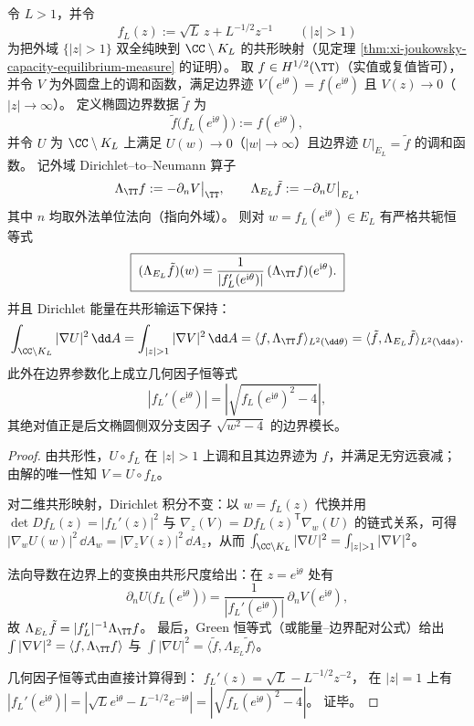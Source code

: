 \begin{theorem}\label{thm:xi-joukowsky-dtn-conjugacy}
令 \(L>1\)，并令
\[
f_L(z):=\sqrt{L}\,z+L^{-1/2}z^{-1}\qquad(|z|>1)
\]
为把外域 \(\{|z|>1\}\) 双全纯映到 \(\CC\setminus K_L\) 的共形映射（见定理 \ref{thm:xi-joukowsky-capacity-equilibrium-measure} 的证明）。
取 \(f\in H^{1/2}(\TT)\)（实值或复值皆可），并令 \(V\) 为外圆盘上的调和函数，满足边界迹 \(V(e^{\mathrm{i}\theta})=f(e^{\mathrm{i}\theta})\) 且 \(V(z)\to 0\)（\(|z|\to\infty\)）。
定义椭圆边界数据 \(\tilde f\) 为
\[
\tilde f\bigl(f_L(e^{\mathrm{i}\theta})\bigr):=f(e^{\mathrm{i}\theta}),
\]
并令 \(U\) 为 \(\CC\setminus K_L\) 上满足 \(U(w)\to 0\)（\(|w|\to\infty\)）且边界迹 \(U|_{E_L}=\tilde f\) 的调和函数。
记外域 Dirichlet--to--Neumann 算子
\[
\Lambda_{\TT}f:=-\partial_{n}V\big|_{\TT},
\qquad
\Lambda_{E_L}\tilde f:=-\partial_{n}U\big|_{E_L},
\]
其中 \(n\) 均取外法单位法向（指向外域）。
则对 \(w=f_L(e^{\mathrm{i}\theta})\in E_L\) 有严格共轭恒等式
\[
\boxed{\;
(\Lambda_{E_L}\tilde f)(w)=\frac{1}{|f_L'(e^{\mathrm{i}\theta})|}\,(\Lambda_{\TT}f)(e^{\mathrm{i}\theta}).\;}
\]
并且 Dirichlet 能量在共形输运下保持：
\[
\int_{\CC\setminus K_L}|\nabla U|^2\,\dd A
=\int_{|z|>1}|\nabla V|^2\,\dd A
=\langle f,\Lambda_{\TT}f\rangle_{L^2(\dd\theta)}
=\langle \tilde f,\Lambda_{E_L}\tilde f\rangle_{L^2(\dd s)}.
\]
此外在边界参数化上成立几何因子恒等式
\[
|f_L'(e^{\mathrm{i}\theta})|
=\left|\sqrt{f_L(e^{\mathrm{i}\theta})^{2}-4}\right|,
\]
其绝对值正是后文椭圆侧双分支因子 \(\sqrt{w^2-4}\) 的边界模长。
\end{theorem}
\begin{proof}
由共形性，\(U\circ f_L\) 在 \(|z|>1\) 上调和且其边界迹为 \(f\)，并满足无穷远衰减；由解的唯一性知 \(V=U\circ f_L\)。
\par
对二维共形映射，Dirichlet 积分不变：以 \(w=f_L(z)\) 代换并用 \(\det Df_L(z)=|f_L'(z)|^2\) 与 \(\nabla_z(V)=Df_L(z)^{\mathsf T}\nabla_w(U)\) 的链式关系，可得
\(
|\nabla_w U(w)|^2\,\dd A_w=|\nabla_z V(z)|^2\,\dd A_z
\)，从而 \(\int_{\CC\setminus K_L}|\nabla U|^2=\int_{|z|>1}|\nabla V|^2\)。
\par
法向导数在边界上的变换由共形尺度给出：在 \(z=e^{\mathrm{i}\theta}\) 处有
\[
\partial_n U\bigl(f_L(e^{\mathrm{i}\theta})\bigr)=\frac{1}{|f_L'(e^{\mathrm{i}\theta})|}\,\partial_n V(e^{\mathrm{i}\theta}),
\]
故 \(\Lambda_{E_L}\tilde f=|f_L'|^{-1}\Lambda_{\TT}f\)。
最后，Green 恒等式（或能量--边界配对公式）给出
\(
\int |\nabla V|^2=\langle f,\Lambda_{\TT}f\rangle
\) 与
\(
\int |\nabla U|^2=\langle \tilde f,\Lambda_{E_L}\tilde f\rangle
\)。
\par
几何因子恒等式由直接计算得到：
\(
f_L'(z)=\sqrt{L}-L^{-1/2}z^{-2}
\)，
在 \(|z|=1\) 上有
\(
|f_L'(e^{\mathrm{i}\theta})|
=|\sqrt{L}e^{\mathrm{i}\theta}-L^{-1/2}e^{-\mathrm{i}\theta}|
=|\sqrt{f_L(e^{\mathrm{i}\theta})^2-4}|
\)。
证毕。
\end{proof}

